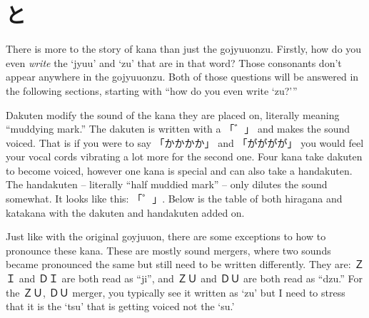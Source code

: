 \section[濁点と半濁点]{と}\label{sec:PR;仮名;濁点と半濁点}

There is more to the story of kana than just the gojyuuonzu. Firstly, how do you even \textit{write} the `jyuu' and `zu' that are in that word? Those consonants don't appear anywhere in the gojyuuonzu. Both of those questions will be answered in the following sections, starting with ``how do you even write `zu?'''

Dakuten modify the sound of the kana they are placed on, literally meaning ``muddying mark.'' The dakuten is written with a 「゛」 and makes the sound voiced. That is if you were to say 「かかかか」 and 「がががが」 you would feel your vocal cords vibrating a lot more for the second one. Four kana take dakuten to become voiced, however one kana is special and can also take a handakuten. The handakuten -- literally ``half muddied mark'' -- only dilutes the sound somewhat. It looks like this: 「゜」. Below is the table of both hiragana and katakana with the dakuten and handakuten added on.





Just like with the original goyjuuon, there are some exceptions to how to pronounce these kana. These are mostly sound mergers, where two sounds became pronounced the same but still need to be written differently. They are: ＺＩ and ＤＩ are both read as ``ji'', and ＺＵ and ＤＵ are both read as ``dzu.'' For the ＺＵ, ＤＵ merger, you typically see it written as `zu' but I need to stress that it is the `tsu' that is getting voiced not the `su.'
